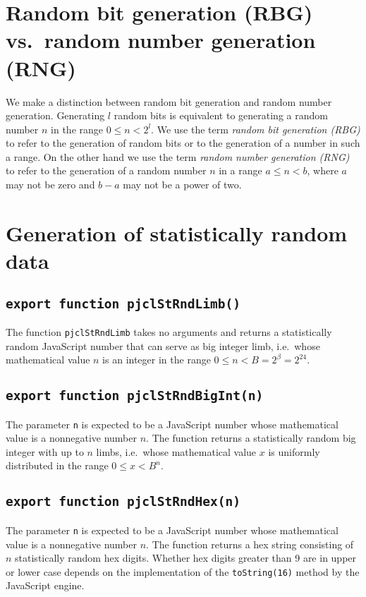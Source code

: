\documentclass[12pt]{article}
\begin{document}
\section{Random bit generation (RBG) vs.\ random number generation (RNG)}

We make a distinction between random bit generation and random number
generation.  Generating $l$ random bits is equivalent to generating a
random number $n$ in the range $0 \leq n < 2^l$.  We use the term {\em random bit
generation (RBG)\/} to refer to the generation of random bits or to the
generation of a number in such a range.  On the other hand we use the
term {\em random number generation (RNG)} to refer to the generation
of a random number $n$ in a range $a \leq n < b$, where $a$ may not be
zero and $b-a$ may not be a power of two.

\section{Generation of statistically random data}

\subsection{\tt export function pjclStRndLimb()}

The function {\tt pjclStRndLimb} takes no arguments and returns a
statistically random JavaScript number that can serve as big integer
limb, i.e.\ whose mathematical value $n$ is an integer in the range $0
\leq n < B = 2^\beta = 2^{24}$.

\subsection{\tt export function pjclStRndBigInt(n)}

The parameter {\tt n} is expected to be a JavaScript number whose
mathematical value is a nonnegative number $n$.  The function returns
a statistically random big integer with up to $n$ limbs, i.e.\ whose
mathematical value $x$ is uniformly distributed in the range $0 \leq x
< B^n$.

\subsection{\tt export function pjclStRndHex(n)}

The parameter {\tt n} is expected to be a JavaScript number whose
mathematical value is a nonnegative number $n$.  The function returns a
hex string consisting of $n$ statistically random hex digits.  Whether hex
digits greater than 9 are in upper or lower case depends on the
implementation of the {\tt toString(16)} method by the JavaScript
engine.
\end{document}
